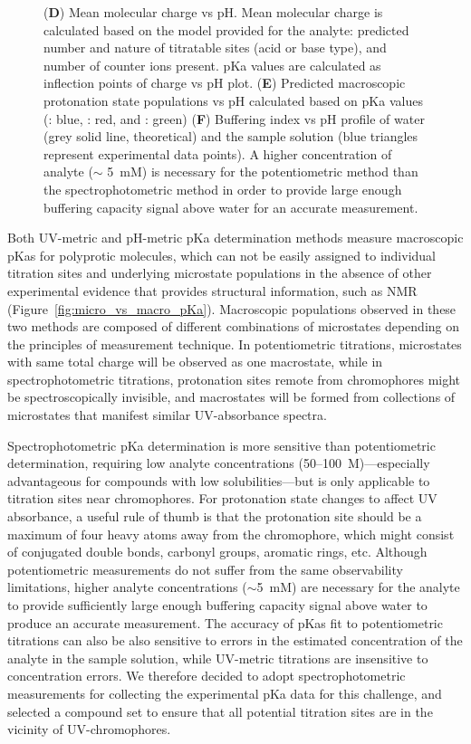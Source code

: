 \documentclass[9pt,lineno]{elife}
\begin{document}
\begin{figure}
{(\textbf{D}) Mean molecular charge vs pH. 
Mean molecular charge is calculated based on the model provided for the analyte: predicted number and nature of titratable sites (acid or base type), and number of counter ions present. pKa values are calculated as inflection points of charge vs pH plot. 
(\textbf{E}) Predicted macroscopic protonation state populations vs pH calculated based on pKa values (: blue, : red, and : green) 
(\textbf{F}) Buffering index vs pH profile of water (grey solid line, theoretical) and the sample solution (blue triangles represent experimental data points). 
A higher concentration of analyte ($\sim$ 5~mM) is necessary for the potentiometric method than the spectrophotometric method in order to provide large enough buffering capacity signal above water for an accurate measurement. 
}
\label{fig:UVmetric_vs_pHmetric_pKa}
\end{figure}

Both UV-metric and pH-metric pKa determination methods measure macroscopic pKas for polyprotic molecules, which can not be easily assigned to individual titration sites and underlying microstate populations in the absence of other experimental evidence that provides structural information, such as NMR (Figure~\ref{fig:micro_vs_macro_pKa}). Macroscopic populations observed in these two methods are composed of different combinations of microstates depending on the principles of measurement technique. 
In potentiometric titrations, microstates with same total charge will be observed as one macrostate, while in spectrophotometric titrations, protonation sites remote from chromophores might be spectroscopically invisible, and macrostates will be formed from collections of microstates that manifest similar UV-absorbance spectra.

Spectrophotometric pKa determination is more sensitive than potentiometric determination, requiring low analyte concentrations (50--100~{\micro}M)---especially advantageous for compounds with low solubilities---but is only applicable to titration sites near chromophores. 
For protonation state changes to affect UV absorbance, a useful rule of thumb is that the protonation site should be a maximum of four heavy atoms away from the chromophore, which might consist of conjugated double bonds, carbonyl groups, aromatic rings, etc.
Although potentiometric measurements do not suffer from the same observability limitations, higher analyte concentrations ($\sim$5~mM) are necessary for the analyte to provide sufficiently large enough buffering capacity signal above water to produce an accurate measurement. 
The accuracy of pKas fit to potentiometric titrations can also be also sensitive to errors in the estimated concentration of the analyte in the sample solution, while UV-metric titrations are insensitive to concentration errors.
We therefore decided to adopt spectrophotometric measurements for collecting the experimental pKa data for this challenge, and selected a compound set to ensure that all potential titration sites are in the vicinity of UV-chromophores.
\end{document}

